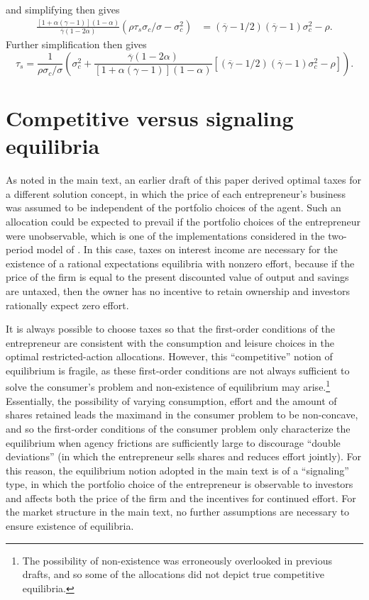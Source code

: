 \documentclass[11pt]{article}
\theoremstyle{plain}
\begin{document}
and simplifying then gives
\begin{align*}
\frac{[1 + \alpha(\gamma-1)](1-\alpha)}{\overline{\gamma}(1 - 2\alpha)}{\left(\rho \tau_s \sigma_c/\sigma - \sigma_c^2\right)} & = (\overline{\gamma}-1/2) (\overline{\gamma}-1) \sigma_c^2 - \rho.
\end{align*}
Further simplification then gives 
\begin{equation}
\tau_s = \frac{1}{\rho\sigma_c/\sigma}{\left(\sigma_c^2 +
\frac{\overline{\gamma}(1 - 2\alpha)}{[1 + \alpha(\gamma-1)](1-\alpha)}  {\left[(\overline{\gamma}-1/2) (\overline{\gamma}-1) \sigma_c^2 - \rho\right]}\right)}.
\label{tax_expression}
\end{equation} %


\section{Competitive versus signaling equilibria} \label{eqcompare}

As noted in the main text, an earlier draft of this paper derived optimal taxes for a different solution concept, in which the price of each entrepreneur's business was assumed to be independent of the portfolio choices of the agent. Such an allocation could be expected to prevail if the portfolio choices of the entrepreneur were unobservable, which is one of the implementations considered in the two-period model of \cite{albanesi_optimal_2006}. In this case, taxes on interest income are necessary for the existence of a rational expectations equilibria with nonzero effort, because if the price of the firm is equal to the present discounted value of output and savings are untaxed, then the owner has no incentive to retain ownership and investors rationally expect zero effort. 

It is always possible to choose taxes so that the first-order conditions of the entrepreneur are consistent with the consumption and leisure choices in the optimal restricted-action allocations. However, this ``competitive'' notion of equilibrium is fragile, as these first-order conditions are not always sufficient to solve the consumer's problem and non-existence of equilibrium may arise.\footnote{The possibility of non-existence was erroneously overlooked in previous drafts, and so some of the allocations did not depict true competitive equilibria.} Essentially, the possibility of varying consumption, effort and the amount of shares retained leads the maximand in the consumer problem to be non-concave, and so the first-order conditions of the consumer problem only characterize the equilibrium when agency frictions are sufficiently large to discourage ``double deviations'' (in which the entrepreneur sells shares and reduces effort jointly). For this reason, the equilibrium notion adopted in the main text is of a ``signaling'' type, in which the portfolio choice of the entrepreneur is observable to investors and affects both the price of the firm and the incentives for continued effort. For the market structure in the main text, no further assumptions are necessary to ensure existence of equilibria. 
\end{document}
